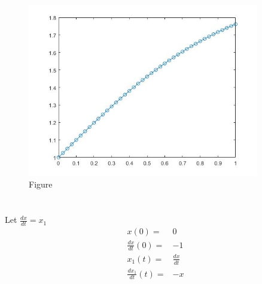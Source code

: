 \documentclass{article}
\begin{document}
        \paragraph{}
            
            
            \begin{figure}[H] 
                \centering 
                \includegraphics[width=0.9\textwidth]{img/Assignement_7_1.jpg}
                \caption{Figure} 
            \end{figure}
    \section{}
        \subsection{}
            \paragraph{}
            Let $\frac{dx}{dt}=x_1$
            \begin{equation*}
                \begin{split}
                    x(0)=&0\\
                    \frac{dx}{dt}(0)=&-1\\
                    x_1(t)=&\frac{dx}{dt}\\
                    \frac{dx_1}{dt}(t)=&-x
                \end{split}
            \end{equation*}
\end{document}
